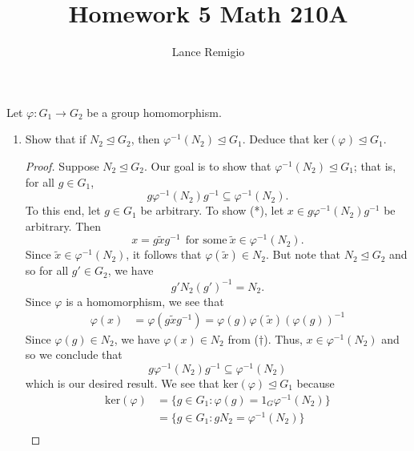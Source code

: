 \documentclass{article}
\title{Homework 5 Math 210A}
\author{Lance Remigio}
\begin{document}
\maketitle

\rhead{\thepage}

\begin{problem}
    Let \( \varphi: {G}_{1} \to {G}_{2} \) be a group homomorphism.
    \begin{enumerate}
        \item[(a)] Show that if \( {N}_{2} \trianglelefteq {G}_{2}  \), then \( \varphi^{-1}({N}_{2}) \trianglelefteq {G}_{1}  \). Deduce that \( \text{ker}(\varphi) \trianglelefteq {G}_{1} \).
            \begin{proof}
            Suppose \( {N}_{2} \trianglelefteq {G}_{2} \). Our goal is to show that \( \varphi^{-1}({N}_{2}) \trianglelefteq {G}_{1} \); that is, for all \( g \in {G}_{1} \),  
            \[  g \varphi^{-1}({N}_{2}) g^{-1} \subseteq \varphi^{-1}({N}_{2}). \tag{*} \]
            To this end, let \( g \in {G}_{1} \) be arbitrary. To show (*), let \( x \in g \varphi^{-1}({N}_{2}) g^{-1} \) be arbitrary. Then 
            \[  x = g \tilde{x} g^{-1} \ \ \text{for some} \  \tilde{x} \in \varphi^{-1}({N}_{2}). \]
            Since \( \tilde{x} \in \varphi^{-1}({N}_{2}) \), it follows that \( \varphi (\tilde{x}) \in {N}_{2}  \). But note that \( {N}_{2} \trianglelefteq {G}_{2} \) and so for all \( g' \in {G}_{2} \), we have  
            \[  g' {N}_{2} (g')^{-1}  = {N}_{2}. \tag{\( \dagger \)} \]
            Since \( \varphi  \) is a homomorphism, we see that 
            \begin{align*}
                \varphi(x) &= \varphi(g \tilde{x} g^{-1}) 
                           = \varphi(g) \varphi(\tilde{x}) (\varphi(g))^{-1}    
            \end{align*}
            Since \( \varphi(g) \in {N}_{2} \), we have \( \varphi(x) \in {N}_{2} \) from (\( \dagger \)). Thus, \( x \in \varphi^{-1}({N}_{2}) \) and so we conclude that   
            \[  g \varphi^{-1}({N}_{2})g^{-1} \subseteq  \varphi^{-1}({N}_{2})\]
            which is our desired result. We see that \( \text{ker}(\varphi) \trianglelefteq {G}_{1} \) because
            \begin{align*}
                \text{ker}(\varphi) &= \{  g \in {G}_{1} : \varphi(g) = {1}_{G} \varphi^{-1}({N}_{2}) \}  \\
                                    &= \{  g \in {G}_{1} : g {N}_{2} =  \varphi^{-1} ({N}_{2})  \}  \\

\end{align*}
\end{proof}
\end{enumerate}
\end{problem}
\end{document}
